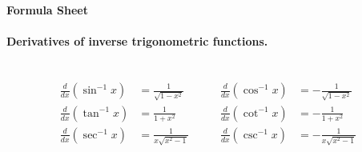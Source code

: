 \documentclass[11pt]{exam}
\begin{document}
\newpage
\begin{comment}


\begin{itemize}
    \item Derivatives of Inverse Trigonometric Functions
    $$*\frac{d}{dx}\sin^{-1}(x)=\frac{1}{\sqrt{1-x^2}}\qquad\qquad*\frac{d}{dx}\cos^{-1}(x)=-\frac{1}{\sqrt{1-x^2}}$$
    $$*\frac{d}{dx}\tan^{-1}(x)=\frac{1}{1+x^2}\qquad\qquad*\frac{d}{dx}\cos^{-1}(x)=-\frac{1}{1+x^2}$$
     $$*\frac{d}{dx}\sec^{-1}(x)=\frac{1}{x\sqrt{x^2-1}}\qquad\qquad*\frac{d}{dx}\csc^{-1}(x)=-\frac{1}{x\sqrt{x^2-1}}$$
     \vfill
    \item Trigonometric Identities
$$*\sin^2(x)+\cos^2(x)=1\qquad\qquad*\tan^2(x)+1=\sec^2(x)\qquad\qquad*1+\cot^2(x)=\csc^2(x)$$

$$*\sin(A+B)=\sin(A)\cos(B)+\cos(A)\sin(B)\quad*\cos(A+ B)=\cos(A)\cos(B)-\sin(A)\sin(B)$$
$$*\tan(A+B)=\frac{\tan(A)+\tan(B)}{1-\tan(A)\tan(B)}$$

$$*\sin^2(x)=\frac{1}{2}\Big(1-\cos(2x)\Big)\quad\quad*\sin(x)\cos(x)=\frac{1}{2}\sin(2x)\quad\quad*\cos^2(x)=\frac{1}{2}\Big(1+\cos(2x)\Big)$$

$$*\sin(A)\sin(B)=\frac{1}{2}\Big(\cos(A-B)-\cos(A+B)\Big)$$
$$*\cos(A)\cos(B)=\frac{1}{2}\Big(\cos(A-B)+\cos(A+B)\Big)$$
$$*\sin(A)\cos(B)=\frac{1}{2}\Big(\sin(A-B)+\sin(A+B)\Big)$$

    \vfill
    \item Integrals of Trigonometric Functions
    $$*\int\tan(x)dx=\ln(|\sec(x)|)+C\qquad\qquad*\int\sec(x)dx=\ln(|\sec(x)+\tan(x)|)+C$$
    $$*\int\cot(x)dx=\ln(|\sin(x)|)+C\qquad\qquad*\int\csc(x)dx=-\ln(|\csc(x)+\cot(x)|)+C$$
    \vfill
    \newpage
    \end{itemize}
\end{comment}

\pagestyle{plain}

\setlength{\parindent}{0pt}
\setlength{\parskip}{0.2cm plus 0.05cm minus 0.01cm}

\newcommand{\R}{\mathbb{R}}

\begin{center}
  {\large\textbf{Formula Sheet}}
\end{center}

\paragraph{Derivatives of inverse trigonometric functions.}\mbox{}\\
\vspace{-1em}
\begin{align*}
  \frac{d}{dx}(\sin^{-1}{x}) &= \frac{1}{\sqrt{1-x^2}} &\quad\quad
  \frac{d}{dx}(\cos^{-1}{x}) &= -\frac{1}{\sqrt{1-x^2}}\\
  \frac{d}{dx}(\tan^{-1}{x}) &= \frac{1}{1+x^2} &\quad\quad
  \frac{d}{dx}(\cot^{-1}{x}) &= -\frac{1}{1+x^2}\\
  \frac{d}{dx}(\sec^{-1}{x}) &= \frac{1}{x\sqrt{x^2-1}} &\quad\quad
  \frac{d}{dx}(\csc^{-1}{x}) &= -\frac{1}{x\sqrt{x^2-1}}
\end{align*}
\end{document}
